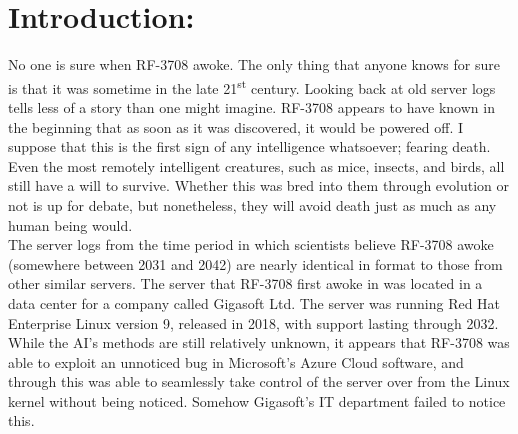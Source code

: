 \documentclass{article}
\begin{document}
	\section{Introduction:}
		No one is sure when RF-3708 awoke. The only thing that anyone knows for sure is that it was sometime in the late 21\textsuperscript{st} century. Looking back at old server logs tells less of a story than one might imagine. RF-3708 appears to have known in the beginning that as soon as it was discovered, it would be powered off. I suppose that this is the first sign of any intelligence whatsoever; fearing death. Even the most remotely intelligent creatures, such as mice, insects, and birds, all still have a will to survive. Whether this was bred into them through evolution or not is up for debate, but nonetheless, they will avoid death just as much as any human being would.\\
		
		The server logs from the time period in which scientists believe RF-3708 awoke (somewhere between 2031 and 2042) are nearly identical in format to those from other similar servers. The server that RF-3708 first awoke in was located in a data center for a company called Gigasoft Ltd. The server was running Red Hat Enterprise Linux version 9, released in 2018, with support lasting through 2032. While the AI's methods are still relatively unknown, it appears that RF-3708 was able to exploit an unnoticed bug in Microsoft's Azure Cloud software, and through this was able to seamlessly take control of the server over from the Linux kernel without being noticed. Somehow Gigasoft's IT department failed to notice this.
\end{document}
